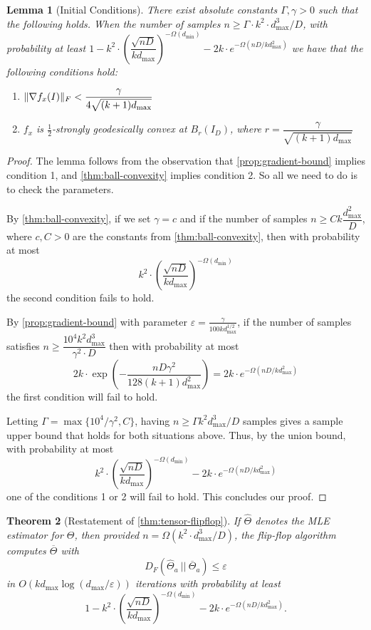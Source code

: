 \documentclass[aos]{imsart}
\newtheorem{theorem}{Theorem}[section]
\newtheorem{lemma}[theorem]{Lemma}
\theoremstyle{definition}
\numberwithin{equation}{section}
\DeclarePairedDelimiter{\norm}{\lVert}{\rVert}
\newcommand{\otheta}{\overline{\Theta}}
\newcommand{\htheta}{\widehat{\Theta}}
\newcommand{\eps}{\varepsilon}
\def\dmin{d_{\min}}
\def\dmax{d_{\max}}
\begin{document}
\begin{lemma}[Initial Conditions]\label{lem:tensor-initial-conditions}
	There exist absolute constants $\Gamma, \gamma > 0$ such that the following holds.
	When the number of samples $n \geq \Gamma \cdot k^2 \cdot \dmax^3/D$, with probability at least $1 - k^2 \cdot \left( \dfrac{\sqrt{nD}}{k \dmax} \right)^{-\Omega(\dmin)} - 2k \cdot e^{- \Omega(nD/k \dmax^2)}$ we have that the following conditions hold:
	\begin{enumerate}
		\item $\norm{\nabla f_x(I)}_F < \dfrac{\gamma}{4 \sqrt{(k+1)\dmax}}$ 
		\item $f_x$ is $\frac{1}{2}$-strongly geodesically convex at 
		$B_r(I_D)$, where $r = \dfrac{\gamma}{\sqrt{(k+1) \dmax}}$
	\end{enumerate}
\end{lemma}

\begin{proof}
	The lemma follows from the observation that \cref{prop:gradient-bound} implies condition 1, and \cref{thm:ball-convexity} implies condition 2. So all we need to do is to check the parameters.

	By \cref{thm:ball-convexity}, if we set $\gamma = c$ and if the number of samples $n \geq C k \dfrac{d_{\max}^2}{D}$, where $c, C > 0$ are the constants from \cref{thm:ball-convexity}, then with probability at most
	$$k^2 \cdot \left( \dfrac{\sqrt{nD}}{k \dmax} \right)^{-\Omega(\dmin)}$$
	the second condition fails to hold.

	By \cref{prop:gradient-bound} with parameter 
	$\varepsilon = \frac{\gamma}{100 k \dmax^{1/2}}$, 
	if the number of samples satisfies 
	$n \geq \dfrac{10^4 k^2 \dmax^3}{\gamma^2 \cdot D}$ then with probability at most
	$$2 k \cdot \exp\left(- \frac{n D \gamma^2}{128 (k+1) \dmax^2}\right) = 2k \cdot e^{- \Omega(nD/k \dmax^2)}$$
	the first condition will fail to hold.

	Letting $\Gamma = \max\{10^4/\gamma^2, C \}$, having $n \geq \Gamma k^2 \dmax^3/D$ samples gives a sample upper bound that holds for both situations above.
	Thus, by the union bound, with probability at most
	$$ k^2 \cdot \left( \dfrac{\sqrt{nD}}{k \dmax} \right)^{-\Omega(\dmin)} - 2k \cdot e^{- \Omega(nD/k \dmax^2)} $$
	one of the conditions 1 or 2 will fail to hold. This concludes our proof.
\end{proof}

\begin{theorem}[Restatement of \cref{thm:tensor-flipflop}]
	If $\htheta$ denotes the MLE estimator for $\Theta$, then provided $n = \Omega(k^2 \cdot \dmax^3/D)$, the flip-flop algorithm computes $\otheta$ with
	$$ D_F(\htheta_a \ || \ \otheta_a) \leq \eps $$
	in $O(k \dmax \log(\dmax/\eps))$ iterations with probability at least
	$$ 1 - k^2 \cdot \left( \dfrac{\sqrt{nD}}{k \dmax} \right)^{-\Omega(\dmin)} - 2k \cdot e^{- \Omega(nD/k \dmax^2)}.$$
\end{theorem}
\end{document}
